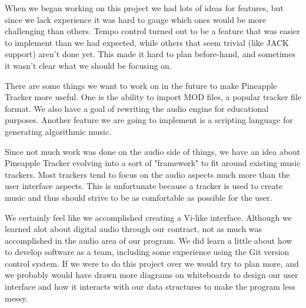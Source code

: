 \documentclass[12pt,letterpaper]{article}
\begin{document}
\par
When we began working on this project we had lots of ideas for features, but since we lack experience it was hard to gauge which ones would be more challenging than others.
Tempo control turned out to be a feature that was easier to implement than we had expected, while others that seem trivial (like JACK support) aren't done yet.
This made it hard to plan before-hand, and sometimes it wasn't clear what we should be focusing on.

\par
There are some things we want to work on in the future to make Pineapple Tracker more useful.
One is the ability to import MOD files, a popular tracker file format.
We also have a goal of rewriting the audio engine for educational purposes.
Another feature we are going to implement is a scripting language for generating algorithmic music.

\par
Since not much work was done on the audio side of things, we have an idea about Pineapple Tracker evolving into a sort of "framework" to fit around existing music trackers.
Most trackers tend to focus on the audio aspects much more than the user interface aspects.
This is unfortunate because a tracker is used to create music and thus should strive to be as comfortable as possible for the user.

\par
We certainly feel like we accomplished creating a Vi-like interface.
Although we learned alot about digital audio through our contract, not as much was accomplished in the audio area of our program.
We did learn a little about how to develop software as a team, including some experience using the Git version control system.
If we were to do this project over we would try to plan more, and we probably would have drawn more diagrams on whiteboards to design our user interface and how it interacts with our data structures to make the program less messy.
\end{document}
